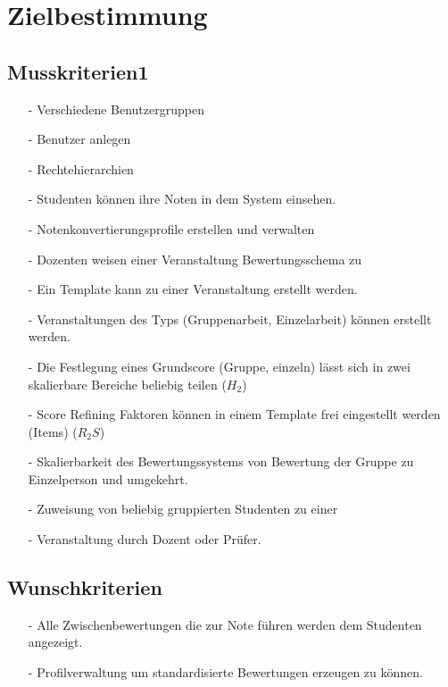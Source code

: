 


	
	\tableofcontents
	\newpage

	\section{Zielbestimmung}
		\subsection{Musskriterien1} 
			
			\begin{itemize}
			\item[-]	Verschiedene Benutzergruppen 
			\item[-]	Benutzer anlegen
			\item[-]	Rechtehierarchien
			\item[-]	Studenten können ihre Noten in dem System einsehen.
			\item[-]	Notenkonvertierungsprofile erstellen und verwalten
			\item[-]	Dozenten weisen einer Veranstaltung Bewertungsschema zu
			\item[-]	Ein Template kann zu einer Veranstaltung erstellt werden.
			\item[-]	Veranstaltungen des Typs (Gruppenarbeit, Einzelarbeit) können erstellt werden.
			\item[-]	Die Festlegung eines Grundscore (Gruppe, einzeln) lässt sich in zwei skalierbare \newline Bereiche beliebig teilen ($H_2$)
			\item[-]	Score Refining Faktoren können in einem Template frei eingestellt werden (Items) ($R_2S$)
			\item[-]	Skalierbarkeit des Bewertungssystems von Bewertung der Gruppe zu Einzelperson und umgekehrt.
			\item[-]	Zuweisung von beliebig gruppierten Studenten zu einer \item[-]	Veranstaltung durch Dozent oder Prüfer.				
			\end{itemize}

			
		\subsection{Wunschkriterien}
		\begin{itemize}
		\item[-]	Alle Zwischenbewertungen die zur Note führen werden dem Studenten angezeigt.
		\item[-]	Profilverwaltung um standardisierte Bewertungen erzeugen zu können.
		\end{itemize}
		
